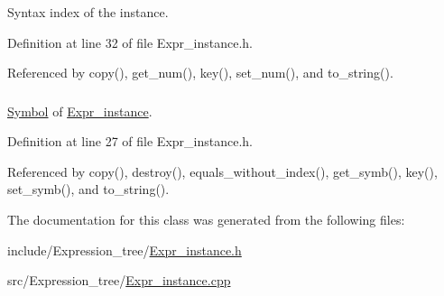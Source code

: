 Syntax index of the instance. 



Definition at line 32 of file Expr\_\-instance.h.



Referenced by copy(), get\_\-num(), key(), set\_\-num(), and to\_\-string().

\hypertarget{classgenevalmag_1_1Expr__instance_ac95a446e179a79d7919c4db67b66b7f0}{
\subsubsection[{i\_\-symb}]{}}
\label{classgenevalmag_1_1Expr__instance_ac95a446e179a79d7919c4db67b66b7f0}


\hyperlink{classgenevalmag_1_1Symbol}{Symbol} of \hyperlink{classgenevalmag_1_1Expr__instance}{Expr\_\-instance}. 



Definition at line 27 of file Expr\_\-instance.h.



Referenced by copy(), destroy(), equals\_\-without\_\-index(), get\_\-symb(), key(), set\_\-symb(), and to\_\-string().



The documentation for this class was generated from the following files:\begin{DoxyCompactItemize}
\item 
include/Expression\_\-tree/\hyperlink{Expr__instance_8h}{Expr\_\-instance.h}\item 
src/Expression\_\-tree/\hyperlink{Expr__instance_8cpp}{Expr\_\-instance.cpp}\end{DoxyCompactItemize}
